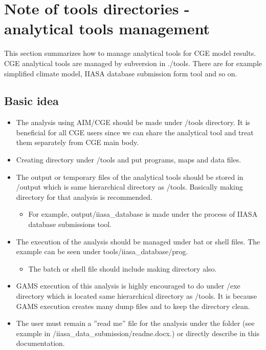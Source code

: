 \documentclass[10pt,a4paper,titlepage,dvipdfmx]{book}
\begin{document}
\section{\label{sec:NotTooDir}Note of tools directories - analytical tools management}

This section summarizes how to manage analytical tools for CGE model results. CGE analytical tools are managed by subversion in ./tools. There are for example simplified climate model, IIASA database submission form tool and so on.

\subsection{\label{subsec:BasIde}Basic idea}


\begin{itemize}
\item The analysis using AIM/CGE should be made under /tools directory. It is beneficial for all CGE users since we can share the analytical tool and treat them separately from CGE main body.
\item Creating directory under /tools and put programs, maps and data files.
\item The output or temporary files of the analytical tools should be stored in /output which is same hierarchical directory as /tools. Basically making directory for that analysis is recommended.
\begin{itemize}
\item For example, output/iiasa\_database is made under the process of IIASA database submissions tool.
\end{itemize}

\item The execution of the analysis should be managed under bat or shell files. The example can be seen under tools/iiasa\_database/prog.
\begin{itemize}
\item The batch or shell file should include making directory also.
\end{itemize}

\item GAMS execution of this analysis is highly encouraged to do under /exe directory which is located same hierarchical directory as /tools. It is because GAMS execution creates many dump files and to keep the directory clean.
\item The user must remain a ''read me'' file for the analysis under the folder (see example in /iiasa\_data\_submission/readne.docx.)  or directly describe in this documentation. 
\end{itemize}
\end{document}
